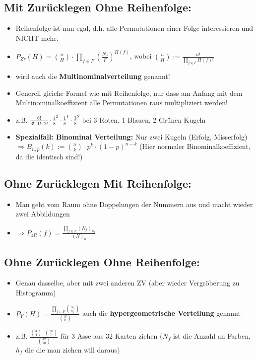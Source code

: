 \documentclass[a4paper,11pt]{scrartcl}
\begin{document}
\subsection{Mit Zurücklegen Ohne Reihenfolge:}

\begin{itemize}
    \item Reihenfolge ist nun egal, d.h. alle Permutationen einer Folge interessieren und NICHT mehr.
    \item $P_{Zr} (H) = \binom{n}{H} \cdot \prod_{f \in F} (\frac{N_f}{F})^{H(f)}$, wobei $\binom{n}{H} := \frac{n!}{\prod_{f \in F} H(f)!}$
    \item wird auch die \textbf{Multinominalverteilung} genannt!
    \item Generell gleiche Formel wie mit Reihenfolge, nur dass am Anfang mit dem Multinominalkoeffizient alle Permutationen raus multipliziert werden!
    \item z.B. $\frac{6!}{3! \cdot 1! \cdot 2!} \cdot \frac{4}{8}^3 \cdot \frac{1}{8}^1 \cdot \frac{3}{8}^2$ bei 3 Roten, 1 Blauen, 2 Grünen Kugeln
    \item \textbf{Spezialfall: Binominal Verteilung:} Nur zwei Kugeln (Erfolg, Misserfolg) $\Rightarrow B_{n,p}(k) := \binom{n}{k} \cdot p^k \cdot (1-p)^{n-k}$ (Hier normaler Binominalkoeffizient, da die identisch sind!)
\end{itemize}

\subsection{Ohne Zurücklegen Mit Reihenfolge:}

\begin{itemize}
    \item Man geht vom Raum ohne Doppelungen der Nummern aus und macht wieder zwei Abbildungen
    \item $\Rightarrow P_{zR}(f) = \frac{\prod_{f \in F} (N_f)_{n_f}}{(N)_n}$
\end{itemize}

\subsection{Ohne Zurücklegen Ohne Reihenfolge:}

\begin{itemize}
    \item Genau dasselbe, aber mit zwei anderen ZV (aber wieder Vergröberung zu Histogramm)
    \item $P_Y (H) = \frac{\prod_{f \in F} \binom{N_f}{h_f}}{\binom{N}{n}}$ auch die \textbf{hypergeometrische Verteilung} genannt
    \item z.B. $\frac{\binom{3}{4} \cdot \binom{28}{7}}{\binom{32}{10}}$ für 3 Asse aus 32 Karten ziehen ($N_f$ ist die Anzahl an Farben, $h_f$ die die man ziehen will daraus)
\end{itemize}
\end{document}
